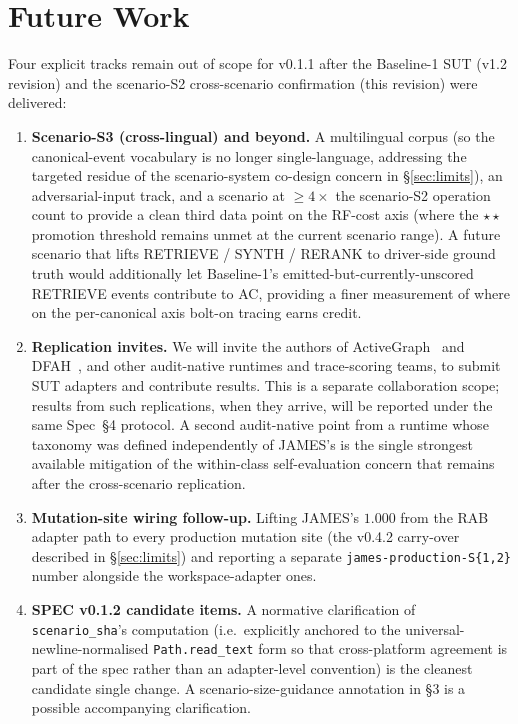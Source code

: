 \documentclass[11pt,a4paper]{article}
\begin{document}
\section{Future Work}
\label{sec:future}

Four explicit tracks remain out of scope for v0.1.1 after the Baseline-1 SUT (v1.2 revision) and the scenario-S2 cross-scenario confirmation (this revision) were delivered:
\begin{enumerate}[leftmargin=*]
  \item \textbf{Scenario-S3 (cross-lingual) and beyond.} A multilingual corpus (so the canonical-event vocabulary is no longer single-language, addressing the targeted residue of the scenario-system co-design concern in §\ref{sec:limits}), an adversarial-input track, and a scenario at $\ge 4\times$ the scenario-S2 operation count to provide a clean third data point on the RF-cost axis (where the $\star\star$ promotion threshold remains unmet at the current scenario range). A future scenario that lifts RETRIEVE / SYNTH / RERANK to driver-side ground truth would additionally let Baseline-1's emitted-but-currently-unscored RETRIEVE events contribute to AC, providing a finer measurement of where on the per-canonical axis bolt-on tracing earns credit.
  \item \textbf{Replication invites.} We will invite the authors of ActiveGraph~\cite{nakajima2026activegraph} and DFAH~\cite{khatchadourian2026dfah}, and other audit-native runtimes and trace-scoring teams, to submit SUT adapters and contribute results. This is a separate collaboration scope; results from such replications, when they arrive, will be reported under the same Spec~§4 protocol. A second audit-native point from a runtime whose taxonomy was defined independently of JAMES's is the single strongest available mitigation of the within-class self-evaluation concern that remains after the cross-scenario replication.
  \item \textbf{Mutation-site wiring follow-up.} Lifting JAMES's $1.000$ from the RAB adapter path to every production mutation site (the v0.4.2 carry-over described in §\ref{sec:limits}) and reporting a separate \texttt{james-production-S\{1,2\}} number alongside the workspace-adapter ones.
  \item \textbf{SPEC v0.1.2 candidate items.} A normative clarification of \texttt{scenario\_sha}'s computation (i.e.\ explicitly anchored to the universal-newline-normalised \texttt{Path.read\_text} form so that cross-platform agreement is part of the spec rather than an adapter-level convention) is the cleanest candidate single change. A scenario-size-guidance annotation in §3 is a possible accompanying clarification.
\end{enumerate}
\end{document}
